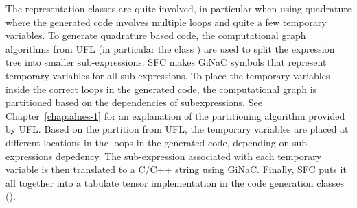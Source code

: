 The representation classes are quite involved, in particular when using
quadrature where the generated code involves multiple loops and quite 
a few temporary variables. To generate quadrature based code, the
computational graph algorithms from UFL (in particular the class
) are used to split the expression tree 
into smaller sub-expressions. 
SFC makes GiNaC symbols that represent temporary variables for all
sub-expressions. 
To place the temporary variables inside the correct loops in the 
generated code, the computational graph is partitioned based on the 
dependencies of subexpressions. See Chapter~\ref{chap:alnes-1} for an
explanation of the partitioning algorithm provided by UFL. 
Based on the partition from UFL, the temporary variables
are placed at different locations in the loops in the generated code, 
depending on sub-expressions depedency. 
The sub-expression associated with each temporary variable is then 
translated to a C/C++ string using GiNaC. Finally, SFC puts it all together
into a tabulate tensor implementation in the code generation classes ().



%
%
%


